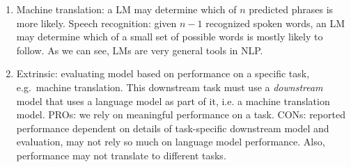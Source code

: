 \documentclass[11pt,a4paper]{article}
\begin{document}
\begin{enumerate}[label=(\alph*)]
    \item Machine translation: a LM may determine which of $n$ predicted
          phrases is more likely.
          Speech recognition: given $n-1$ recognized spoken words, an LM may
          determine which of a small set of possible words is mostly likely to
          follow.
          As we can see, LMs are very general tools in NLP.
    \item Extrinsic: evaluating model based on performance on a specific task,
          e.g.\ machine translation.
          This downstream task must use a \emph{downstream} model that uses a
          language model as part of it, i.e. a machine translation model.
          PROs: we rely on meaningful performance on a task.
          CONs: reported performance dependent on details of task-specific
          downstream model and evaluation, may not rely so much on language
          model performance. Also, performance may not translate to different
          tasks.


\end{enumerate}
\end{document}
